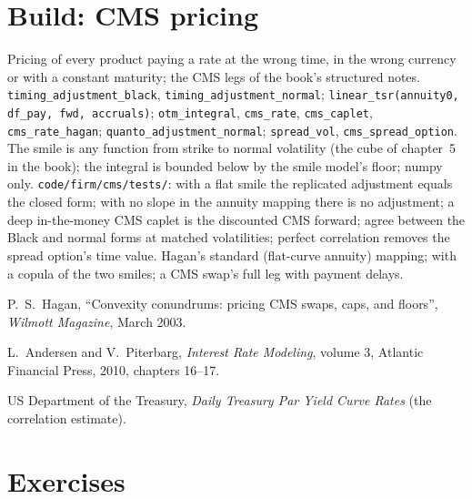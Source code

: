 \section{Build: CMS pricing}\label{bld:rc:convexity-adjustments-and-constant-maturity-products:cms}

\begin{build}
 Pricing of every product paying a rate at the wrong time, in
the wrong currency or with a constant maturity; the CMS legs of the book's
structured notes.
 \texttt{timing\_adjustment\_black},
\texttt{timing\_adjustment\_normal}; \texttt{linear\_tsr(annuity0, df\_pay, fwd,
accruals)}; \texttt{otm\_integral}, \texttt{cms\_rate}, \texttt{cms\_caplet},
\texttt{cms\_rate\_hagan}; \texttt{quanto\_adjustment\_normal};
\texttt{spread\_vol}, \texttt{cms\_spread\_option}.
 The smile is any function from strike to normal volatility (the
cube of chapter~5 in the book); the integral is bounded below by the smile
model's floor; numpy only.
 \texttt{code/firm/cms/tests/}: with a flat smile the
replicated adjustment equals the closed form; with no slope in the annuity
mapping there is no adjustment; a deep in-the-money CMS caplet is the
discounted CMS forward;  agree between the Black and normal
forms at matched volatilities; perfect correlation removes the spread option's
time value.
 Hagan's standard (flat-curve annuity) mapping; 
with a copula of the two smiles; a CMS swap's full leg with payment delays.
\end{build}

\begin{omsources}
\item P.\ S.\ Hagan, ``Convexity conundrums: pricing CMS swaps, caps, and
floors'', \emph{Wilmott Magazine}, March 2003.
\item L.\ Andersen and V.\ Piterbarg, \emph{Interest Rate Modeling}, volume 3,
Atlantic Financial Press, 2010, chapters 16--17.
\item US Department of the Treasury, \emph{Daily Treasury Par Yield Curve Rates}
(the correlation estimate).
\end{omsources}

\section{Exercises}

